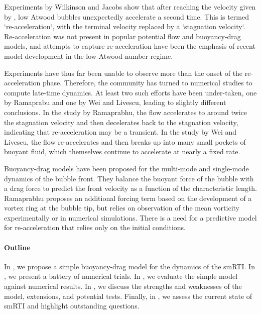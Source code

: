 Experiments by Wilkinson and Jacobs show that after reaching the velocity given by , low Atwood bubbles unexpectedly accelerate a second time.
This is termed `re-acceleration`, with the terminal velocity replaced by a `stagnation velocity`.
Re-acceleration was not present in popular potential flow and buoyancy-drag models, and attempts to capture re-acceleration have been the emphasis of recent model development in the low Atwood number regime.

Experiments have thus far been unable to observe more than the onset of the re-acceleration phase.
Therefore, the community has turned to numerical studies to compute late-time dynamics.
At least two such efforts have been under-taken, one by Ramaprabu \etal and one by Wei and Livescu, leading to slightly different conclusions.
In the study by Ramaprabhu, the flow accelerates to around twice the stagnation velocity and then decelerates back to the stagnation velocity, indicating that re-acceleration may be a transient.
In the study by Wei and Livescu, the flow re-accelerates and then breaks up into many small pockets of buoyant fluid, which themselves continue to accelerate at nearly a fixed rate.

Buoyancy-drag models have been proposed for the multi-mode and single-mode dynamics of the bubble front.
They balance the buoyant force of the bubble with a drag force to predict the front velocity as a function of the characteristic length.
Ramaprabhu proposes an additional forcing term based on the development of a vortex ring at the bubble tip, but relies on observation of the mean vorticity experimentally or in numerical simulations.
There is a need for a predictive model for re-acceleration that relies only on the initial conditions.

\paragraph{Outline}
In , we propose a simple buoyancy-drag model for the dynamics of the smRTI.
In , we present a battery of numerical trials.
In , we evaluate the simple model against numerical results.
In , we discuss the strengths and weaknesses of the model, extensions, and potential tests.
Finally, in , we assess the current state of smRTI and highlight outstanding questions.

